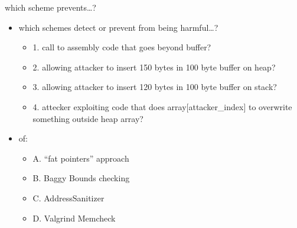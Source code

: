 \begin{frame}{which scheme prevents\ldots?}
\begin{itemize}
\item which schemes detect or prevent from being harmful\ldots?
    \begin{itemize}
    \item 1. call to assembly code that goes beyond buffer?
    \item 2. allowing attacker to insert 150 bytes in 100 byte buffer on heap?
    \item 3. allowing attacker to insert 120 bytes in 100 byte buffer on stack?
    \item 4. attecker exploiting code that does array[attacker\_index] to overwrite something outside heap array?
    \end{itemize}
\item of:
    \begin{itemize}
    \item A. ``fat pointers'' approach
    \item B. Baggy Bounds checking
    \item C. AddressSanitizer
    \item D. Valgrind Memcheck
    \end{itemize}
\end{itemize}
\end{frame}
